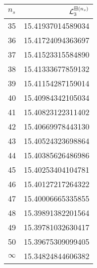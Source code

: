 \begin{tabular}[t]{|lr}
\toprule
  $n_{s}$ &  $\mathcal L^{\boxplus (n_s)}_3$ \\
\midrule
       35 &                   15.41937014589034 \\
       36 &                   15.41724094363697 \\
       37 &                   15.41523315584890 \\
       38 &                   15.41333677859132 \\
       39 &                   15.41154287159014 \\
       40 &                   15.40984342105034 \\
       41 &                   15.40823122311402 \\
       42 &                   15.40669978443130 \\
       43 &                   15.40524323698864 \\
       44 &                   15.40385626486986 \\
       45 &                   15.40253404104781 \\
       46 &                   15.40127217264322 \\
       47 &                   15.40006665335855 \\
       48 &                   15.39891382201564 \\
       49 &                   15.39781032630417 \\
       50 &                   15.39675309099405 \\
 $\infty$ &                   15.34824844606382 \\
\bottomrule
\end{tabular}
